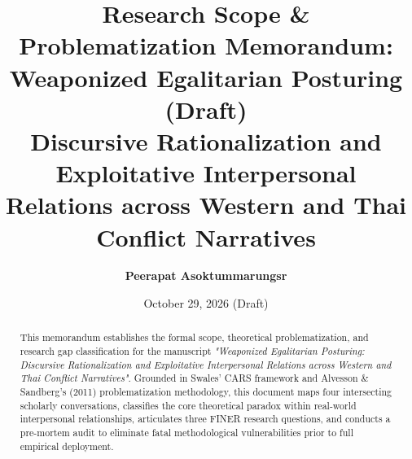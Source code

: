 \documentclass[11pt,a4paper]{article}
\title{\textbf{Research Scope \& Problematization Memorandum: Weaponized Egalitarian Posturing (Draft)}\\[0.3ex]
\large Discursive Rationalization and Exploitative Interpersonal Relations across Western and Thai Conflict Narratives}
\author{\textbf{Peerapat Asoktummarungsr}}
\date{October 29, 2026 (Draft)}
\begin{document}
\maketitle

\begin{abstract}
This memorandum establishes the formal scope, theoretical problematization, and research gap classification for the manuscript \textit{"Weaponized Egalitarian Posturing: Discursive Rationalization and Exploitative Interpersonal Relations across Western and Thai Conflict Narratives"}. Grounded in Swales' CARS framework and Alvesson \& Sandberg's (2011) problematization methodology, this document maps four intersecting scholarly conversations, classifies the core theoretical paradox within real-world interpersonal relationships, articulates three FINER research questions, and conducts a pre-mortem audit to eliminate fatal methodological vulnerabilities prior to full empirical deployment.
\end{abstract}
\end{document}
